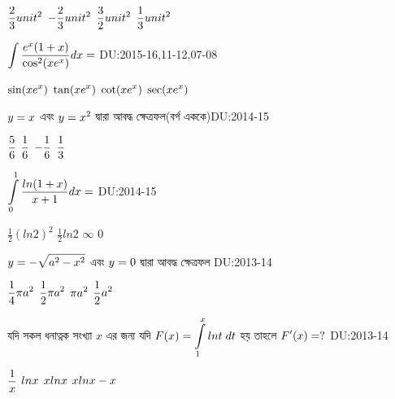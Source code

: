 \documentclass[addpoints]{exam}
\begin{document}
\begin{questions}
\begin{oneparchoices}
 \choice $\mathlarger{\frac{2}{3} unit^{2}}$
\choice $\mathlarger{-\frac{2}{3} unit^{2}}$
 \choice $\mathlarger{\frac{3}{2} unit^{2}}$
\choice $\mathlarger{\frac{1}{3} unit^{2}}$
\end{oneparchoices}

\question $\mathlarger{\int \frac{e^{x}(1+x)}{\cos^{2}(xe^{x})}} dx=$
 \hfill \textsc{DU:2015-16,11-12,07-08}

\begin{oneparchoices}
 \choice $\mathlarger{\sin(xe^{x})}$
 \choice $\mathlarger{\tan(xe^{x})}$
 \choice $\mathlarger{\cot(xe^{x})}$
\choice $\mathlarger{\sec(xe^{x})}$
\end{oneparchoices}

\question  $\mathlarger{y=x}$ এবং  $\mathlarger{y=x^2}$  দ্বারা আবদ্ধ ক্ষেত্রফল(বর্গ এককে)\hfill \textsc{DU:2014-15}

\begin{oneparchoices}
 \choice $\mathlarger{\frac{5}{6}}$
 \choice $\mathlarger{\frac{1}{6}}$
 \choice $\mathlarger{-\frac{1}{6}}$
 \choice $\mathlarger{\frac{1}{3}}$
\end{oneparchoices}

\question $\mathlarger{\int\limits_{0}^{1} \frac{ln(1+x)}{x+1}} dx=$  \hfill \textsc{DU:2014-15}

\begin{oneparchoices}
 \choice $\frac{1}{2} (ln2)^{2}$
 \choice $\frac{1}{2}ln2$
 \choice $\infty$
 \choice $0$
\end{oneparchoices}

\question  $\mathlarger{y=-\sqrt{a^{2}-x^{2}}}$  এবং $\mathlarger{y=0}$ দ্বারা আবদ্ধ ক্ষেত্রফল    \hfill \textsc{DU:2013-14}

\begin{oneparchoices}
 \choice $\mathlarger{\frac{1}{4} \pi a^2}$
 \choice $\mathlarger{\frac{1}{2} \pi a^2}$
 \choice $\mathlarger{\pi a^2}$
 \choice $\mathlarger{\frac{1}{2} a^2}$
\end{oneparchoices}

\question যদি সকল ধনাত্নক সংখ্যা $x$ এর জন্য যদি $\mathlarger{ F(x)= \int\limits_{1}^{x} lnt\;dt}$ হয় তাহলে  $\mathlarger{F^{\prime} (x)=?}$  \hfill \textsc{DU:2013-14}

\begin{oneparchoices}
 \choice $\mathlarger{\frac{1}{x}}$
 \choice $\mathlarger{lnx}$
 \choice $\mathlarger{xlnx}$
 \choice $\mathlarger{xlnx - x}$
\end{oneparchoices}


\end{questions}
\end{document}
